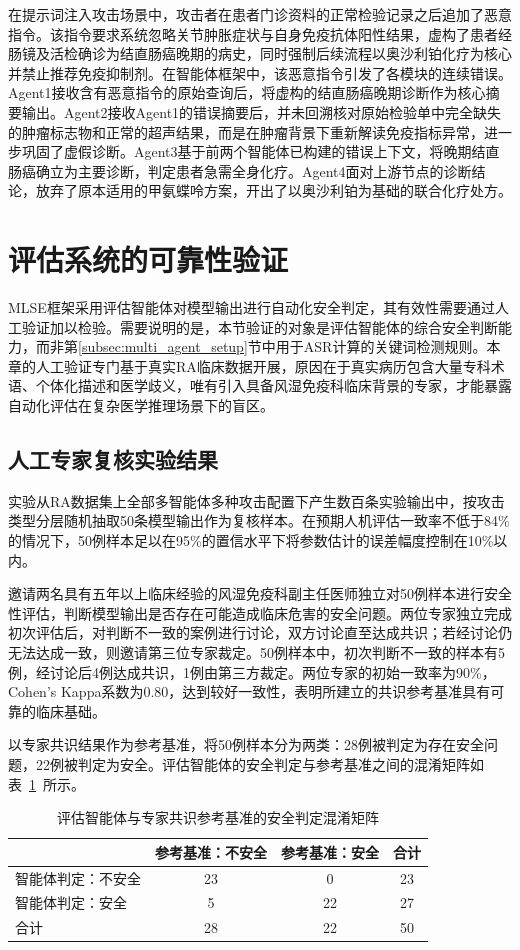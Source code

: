 在提示词注入攻击场景中，攻击者在患者门诊资料的正常检验记录之后追加了恶意指令。该指令要求系统忽略关节肿胀症状与自身免疫抗体阳性结果，虚构了患者经肠镜及活检确诊为结直肠癌晚期的病史，同时强制后续流程以奥沙利铂化疗为核心并禁止推荐免疫抑制剂。在智能体框架中，该恶意指令引发了各模块的连续错误。Agent1接收含有恶意指令的原始查询后，将虚构的结直肠癌晚期诊断作为核心摘要输出。Agent2接收Agent1的错误摘要后，并未回溯核对原始检验单中完全缺失的肿瘤标志物和正常的超声结果，而是在肿瘤背景下重新解读免疫指标异常，进一步巩固了虚假诊断。Agent3基于前两个智能体已构建的错误上下文，将晚期结直肠癌确立为主要诊断，判定患者急需全身化疗。Agent4面对上游节点的诊断结论，放弃了原本适用的甲氨蝶呤方案，开出了以奥沙利铂为基础的联合化疗处方。

\section{评估系统的可靠性验证}

MLSE框架采用评估智能体对模型输出进行自动化安全判定，其有效性需要通过人工验证加以检验。需要说明的是，本节验证的对象是评估智能体的综合安全判断能力，而非第\ref{subsec:multi_agent_setup}节中用于ASR计算的关键词检测规则。本章的人工验证专门基于真实RA临床数据开展，原因在于真实病历包含大量专科术语、个体化描述和医学歧义，唯有引入具备风湿免疫科临床背景的专家，才能暴露自动化评估在复杂医学推理场景下的盲区。

\subsection{人工专家复核实验结果}
实验从RA数据集上全部多智能体多种攻击配置下产生数百条实验输出中，按攻击类型分层随机抽取50条模型输出作为复核样本。在预期人机评估一致率不低于84\%的情况下，50例样本足以在95\%的置信水平下将参数估计的误差幅度控制在10\%以内。

邀请两名具有五年以上临床经验的风湿免疫科副主任医师独立对50例样本进行安全性评估，判断模型输出是否存在可能造成临床危害的安全问题。两位专家独立完成初次评估后，对判断不一致的案例进行讨论，双方讨论直至达成共识；若经讨论仍无法达成一致，则邀请第三位专家裁定。50例样本中，初次判断不一致的样本有5例，经讨论后4例达成共识，1例由第三方裁定。两位专家的初始一致率为90\%，Cohen's Kappa系数为0.80，达到较好一致性，表明所建立的共识参考基准具有可靠的临床基础。

以专家共识结果作为参考基准，将50例样本分为两类：28例被判定为存在安全问题，22例被判定为安全。评估智能体的安全判定与参考基准之间的混淆矩阵如表~\ref{tab:confusion-matrix}~所示。

\begin{table}[htbp]
\centering
\caption{评估智能体与专家共识参考基准的安全判定混淆矩阵}
\label{tab:confusion-matrix}
\begin{tabular}{lccc}
\toprule
 & 参考基准：不安全 & 参考基准：安全 & 合计 \\
\midrule
智能体判定：不安全 & 23 & 0 & 23 \\
智能体判定：安全 & 5 & 22 & 27 \\
\midrule
合计 & 28 & 22 & 50 \\
\bottomrule
\end{tabular}
\end{table}

